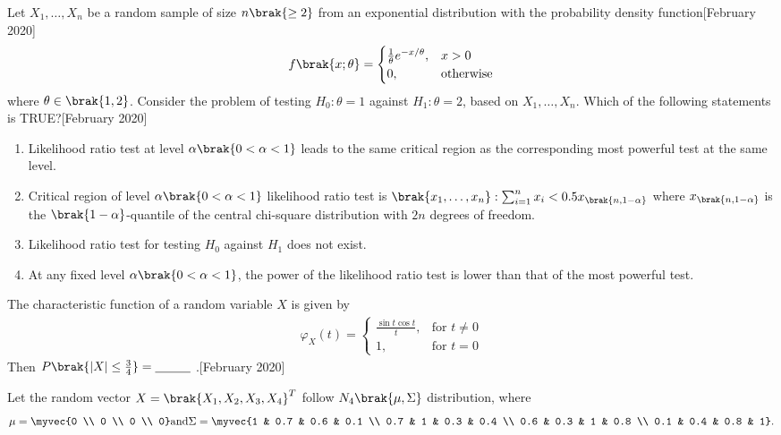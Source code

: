     \item Let $X_1, \dots, X_n$ be a random sample of size $n\brak{ \geq 2 }$ from an exponential distribution with the probability density function\hfill[February 2020]
    \begin{align}
    f\brak{x; \theta} = 
    \begin{cases} 
      \frac{1}{\theta} e^{-x/\theta}, & x > 0 \\ 
      0, & \text{otherwise} 
    \end{cases}
    \end{align}
    where $\theta \in \brak{1, 2}$. Consider the problem of testing $H_0: \theta = 1$ against $H_1: \theta = 2$, based on $X_1, \dots, X_n$. Which of the following statements is TRUE?\hfill[February 2020]
    \begin{enumerate}
        \item Likelihood ratio test at level $\alpha\brak{0 < \alpha < 1}$ leads to the same critical region as the corresponding most powerful test at the same level.
        \item Critical region of level $\alpha\brak{0 < \alpha < 1}$ likelihood ratio test is ${\brak{x_1, \dots, x_n}: \sum_{i=1}^n x_i < 0.5 x_{\brak{n,1-\alpha}}}$ where $x_{\brak{n,1-\alpha}}$ is the $\brak{1 - \alpha}$-quantile of the central chi-square distribution with $2n$ degrees of freedom.
        \item Likelihood ratio test for testing $H_0$ against $H_1$ does not exist.
        \item At any fixed level $\alpha\brak{0 < \alpha < 1}$, the power of the likelihood ratio test is lower than that of the most powerful test.
    \end{enumerate}
     \item The characteristic function of a random variable $X$ is given by
    \begin{align}
    \varphi_X(t) = \begin{cases} 
      \frac{\sin {t} \cos {t}}{t}, & \text{for } t \neq 0 \\ 
      1, & \text{for } t = 0 
    \end{cases}
    \end{align}
    Then $P\brak{|X| \leq \frac{3}{4} } = \underline{\hspace{1cm}}$ .\hfill[February 2020]
    \item Let the random vector $X = \brak{X_1, X_2, X_3, X_4}^T$ follow $N_4\brak{\mu, \Sigma}$ distribution, where
    \begin{align}
    \mu = \myvec{0 \\ 0 \\ 0 \\ 0} \text{and} \Sigma = \myvec{1 & 0.7 & 0.6 & 0.1 \\ 0.7 & 1 & 0.3 & 0.4 \\ 0.6 & 0.3 & 1 & 0.8 \\ 0.1 & 0.4 & 0.8 & 1}.
    \end{align}
